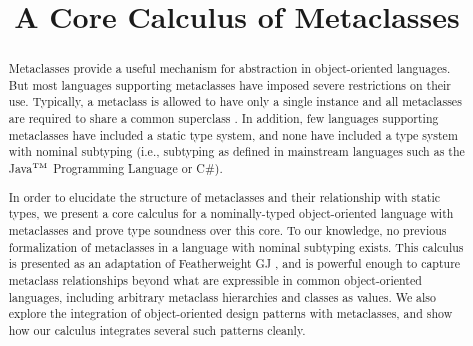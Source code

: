 \documentclass{acm-sigplan}
\begin{document}
\title{A Core Calculus of Metaclasses}



\maketitle


\begin{abstract}
Metaclasses provide a useful mechanism for abstraction in
object-oriented languages.  But most languages supporting metaclasses
have imposed severe restrictions on their use. Typically, a metaclass
is allowed to have only a single instance and all metaclasses are
required to share a common superclass \cite{objvlisp}. In addition,
few languages supporting metaclasses have included a static type
system, and none have included a type system with nominal subtyping
(i.e., subtyping as defined in mainstream languages such as the
Java${^{\mbox{\tiny{TM}}}}$ Programming Language or C\#).

In order to elucidate the structure of
metaclasses and their relationship with static types, we present a
core calculus for a nominally-typed object-oriented language with
metaclasses and prove type soundness over this core. 
To our knowledge, no previous formalization of metaclasses in a 
language with nominal subtyping exists.
This calculus is
presented as an adaptation of Featherweight GJ \cite{FJ}, and is
powerful enough to capture metaclass relationships beyond what are
expressible in common object-oriented languages, including arbitrary
metaclass hierarchies and classes as values.  We also explore the
integration of object-oriented design patterns with metaclasses, and
show how our calculus integrates several such patterns cleanly.
\end{abstract}
\end{document}
